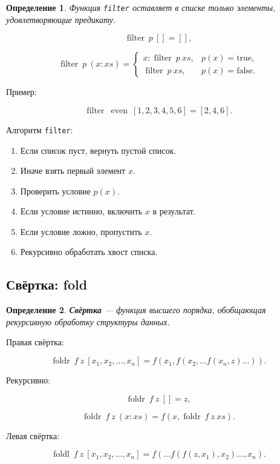 \documentclass[12pt,a4paper]{article}
\newtheorem{definition}{Определение}
\begin{document}
\begin{definition}
Функция \texttt{filter} оставляет в списке только элементы, удовлетворяющие предикату.
\end{definition}

\[
\operatorname{filter}\ p\ [] = [],
\]

\[
\operatorname{filter}\ p\ (x:xs) =
\begin{cases}
x : \operatorname{filter}\ p\ xs, & p(x) = \text{true}, \\
\operatorname{filter}\ p\ xs, & p(x) = \text{false}.
\end{cases}
\]

Пример:

\[
\operatorname{filter}\ \operatorname{even}\ [1,2,3,4,5,6]
=
[2,4,6].
\]

Алгоритм \texttt{filter}:

\begin{enumerate}
  \item Если список пуст, вернуть пустой список.
  \item Иначе взять первый элемент $x$.
  \item Проверить условие $p(x)$.
  \item Если условие истинно, включить $x$ в результат.
  \item Если условие ложно, пропустить $x$.
  \item Рекурсивно обработать хвост списка.
\end{enumerate}

\subsection{Свёртка: fold}

\begin{definition}
\textbf{Свёртка} --- функция высшего порядка, обобщающая рекурсивную обработку структуры данных.
\end{definition}

Правая свёртка:

\[
\operatorname{foldr}\ f\ z\ [x_1,x_2,\dots,x_n]
=
f(x_1, f(x_2, \dots f(x_n,z)\dots)).
\]

Рекурсивно:

\[
\operatorname{foldr}\ f\ z\ [] = z,
\]

\[
\operatorname{foldr}\ f\ z\ (x:xs) = f(x, \operatorname{foldr}\ f\ z\ xs).
\]

Левая свёртка:

\[
\operatorname{foldl}\ f\ z\ [x_1,x_2,\dots,x_n]
=
f(\dots f(f(z,x_1),x_2)\dots,x_n).
\]
\end{document}
